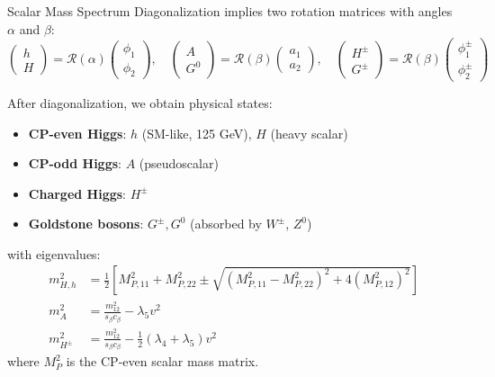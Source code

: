 \documentclass{../bredelebeamer}
\begin{document}
\begin{frame}{Scalar Mass Spectrum}
      Diagonalization implies two rotation matrices with angles $\alpha$ and $\beta$:
    {\small
    \begin{equation*}
        \begin{pmatrix}
            h \\ H
        \end{pmatrix}
        =\mathcal{R}(\alpha)
        \begin{pmatrix}
            \phi_1 \\ \phi_2
        \end{pmatrix},
        \quad
        \begin{pmatrix}
            A \\ G^0
        \end{pmatrix}
        =\mathcal{R}(\beta)
        \begin{pmatrix}
            a_1 \\ a_2
        \end{pmatrix},
        \quad
        \begin{pmatrix}
            H^\pm \\ G^\pm
        \end{pmatrix}
        =\mathcal{R}(\beta)
        \begin{pmatrix}
            \phi_1^\pm \\ \phi_2^\pm
        \end{pmatrix}
    \end{equation*}
    }

    After diagonalization, we obtain physical states:
    {\small
      \begin{itemize}
            \item \textbf{CP-even Higgs}: $h$ (SM-like, 125 GeV), $H$ (heavy scalar)
            \item \textbf{CP-odd Higgs}: $A$ (pseudoscalar)
            \item \textbf{Charged Higgs}: $H^\pm$ 
            \item \textbf{Goldstone bosons}: $G^\pm, G^0$ (absorbed by $W^\pm$, $Z^0$)
      \end{itemize}
    }
    with eigenvalues:
    \begin{align*}
    m_{H,h}^2 &= \frac{1}{2}\left[
    M_{P,11}^2 + M_{P,22}^2 \pm \sqrt{(M_{P,11}^2-M_{P,22}^2)^2 + 4(M_{P,12}^2)^2}
    \right] \\
    m_A^2 &= \frac{m_{12}^2}{s_\beta c_\beta} - \lambda_5 v^2 \\
    m_{H^\pm}^2 &= \frac{m_{12}^2}{s_\beta c_\beta} - \frac{1}{2}(\lambda_4+\lambda_5) v^2
    \end{align*}
    where $M_P^2$ is the CP-even scalar mass matrix.

\end{frame}
\end{document}
